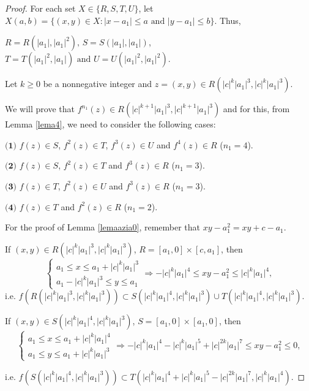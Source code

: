 \documentclass[11pt]{amsart}
\theoremstyle{definition}
\begin{document}
\begin{proof}
For each set $X\in\{R,S,T,U\}$, let $X(a,b)=\{(x,y)\in X:|x-a_1|\leq a \textrm{ and } |y-a_1|\leq b\}$. Thus, 
\begin{center} 
$R=R(|a_1|,|a_1|^2) \textrm{, } S=S(|a_1|,|a_1|)$, $T=T(|a_1|^2,|a_1|) \textrm{ and } U=U(|a_1|^2,|a_1|^2)$.
\end{center}	
	Let $k\geq 0$ be a nonnegative integer and $z=(x,y)\in R(|c|^k|a_1|^3,|c|^k|a_1|^3)$.

We will prove that $f^{n_1}(z)\in R(|c|^{k+1}|a_1|^3,|c|^{k+1}|a_1|^3)$ and for this, from Lemma \ref{lema4}, we need to consider the following cases:

\noindent $\textbf{(1)}$ $f(z)\in S$,  $f^2(z)\in T$,  $f^3(z)\in U$ and  $f^4(z)\in R$ ($n_1=4$).

\noindent $\textbf{(2)}$ $f(z)\in S$,  $f^2(z)\in T$ and  $f^3(z)\in R$ ($n_1=3$).

\noindent $\textbf{(3)}$ $f(z)\in T$,  $f^2(z)\in U$ and  $f^3(z)\in R$ ($n_1=3$).

\noindent $\textbf{(4)}$ $f(z)\in T$ and $f^2(z)\in R$ ($n_1=2$).

\vspace{1em}

For the proof of Lemma \ref{lemaazia0}, remember that $xy-a_1^2=xy+c-a_1$.

If $(x,y)\in R(|c|^k|a_1|^3,|c|^k|a_1|^3)$, $R=[a_1,0]\times [c,a_1]$, then
	$$\left\{
	\begin{array}{l}
	a_1\leq x\leq a_1+|c|^k|a_1|^3 \\
	a_1-|c|^k|a_1|^3\leq y\leq a_1
	\end{array}
	\right.
	\Longrightarrow -|c|^k|a_1|^4\leq xy-a_1^2\leq |c|^k|a_1|^4,
	$$
\noindent i.e. $f(R(|c|^k|a_1|^3,|c|^k|a_1|^3))\subset S(|c|^k|a_1|^4,|c|^k|a_1|^3)\cup T(|c|^k|a_1|^4,|c|^k|a_1|^3)$.

\vspace{1em} 

If $(x,y)\in S(|c|^k|a_1|^4,|c|^k|a_1|^3)$, $S=[a_1,0]\times [a_1,0]$, then
$$\left\{
\begin{array}{l}
a_1\leq x\leq a_1+|c|^k|a_1|^4 \\
a_1\leq y\leq a_1+|c|^k|a_1|^3
\end{array}
\right.
\Longrightarrow -|c|^k|a_1|^4-|c|^k|a_1|^5+|c|^{2k}|a_1|^7\leq xy-a_1^2\leq 0,
$$

\noindent i.e. $f(S(|c|^k|a_1|^4,|c|^k|a_1|^3))\subset T(|c|^k|a_1|^4+|c|^k|a_1|^5-|c|^{2k}|a_1|^7,|c|^k|a_1|^4)$.


\end{proof}
\end{document}
